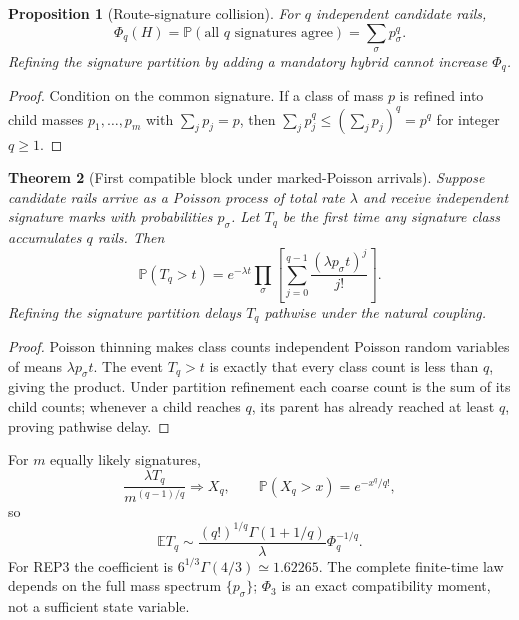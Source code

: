 \documentclass[aps,prx,preprint,superscriptaddress,nofootinbib,longbibliography]{revtex4-2}
\newtheorem{theorem}{Theorem}\newtheorem{proposition}[theorem]{Proposition}\newtheorem{lemma}[theorem]{Lemma}\newtheorem{corollary}[theorem]{Corollary}\newtheorem{definition}[theorem]{Definition}
\newcommand{\E}{\mathbb E}\newcommand{\Prob}{\mathbb P}
\begin{document}
\begin{proposition}[Route-signature collision]
For $q$ independent candidate rails,
\begin{equation}
\Phi_q(H)=\Prob(\text{all }q\text{ signatures agree})=\sum_\sigma p_\sigma^q.
\end{equation}
Refining the signature partition by adding a mandatory hybrid cannot increase $\Phi_q$.
\end{proposition}
\begin{proof}
Condition on the common signature. If a class of mass $p$ is refined into child masses $p_1,\ldots,p_m$ with $\sum_jp_j=p$, then $\sum_jp_j^q\le(\sum_jp_j)^q=p^q$ for integer $q\ge1$.
\end{proof}

\begin{theorem}[First compatible block under marked-Poisson arrivals]
Suppose candidate rails arrive as a Poisson process of total rate $\lambda$ and receive independent signature marks with probabilities $p_\sigma$. Let $T_q$ be the first time any signature class accumulates $q$ rails. Then
\begin{equation}
\Prob(T_q>t)=e^{-\lambda t}\prod_\sigma\left[\sum_{j=0}^{q-1}\frac{(\lambda p_\sigma t)^j}{j!}\right].
\end{equation}
Refining the signature partition delays $T_q$ pathwise under the natural coupling.
\end{theorem}
\begin{proof}
Poisson thinning makes class counts independent Poisson random variables of means $\lambda p_\sigma t$. The event $T_q>t$ is exactly that every class count is less than $q$, giving the product. Under partition refinement each coarse count is the sum of its child counts; whenever a child reaches $q$, its parent has already reached at least $q$, proving pathwise delay.
\end{proof}
For $m$ equally likely signatures,
\begin{equation}
\frac{\lambda T_q}{m^{(q-1)/q}}\Rightarrow X_q,
\qquad \Prob(X_q>x)=e^{-x^q/q!},
\end{equation}
so
\begin{equation}
\E T_q\sim\frac{(q!)^{1/q}\Gamma(1+1/q)}{\lambda}\Phi_q^{-1/q}.
\end{equation}
For REP3 the coefficient is $6^{1/3}\Gamma(4/3)\simeq1.62265$. The complete finite-time law depends on the full mass spectrum $\{p_\sigma\}$; $\Phi_3$ is an exact compatibility moment, not a sufficient state variable.
\end{document}
